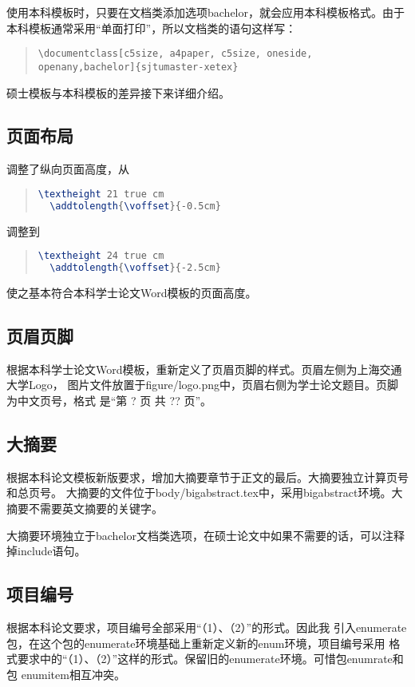 使用本科模板时，只要在文档类添加选项bachelor，就会应用本科模板格式。由于本科模板通常采用``单面打印''，所以文档类的语句这样写：

\begin{quote}
  {\scriptsize\verb+\documentclass[c5size, a4paper, c5size, oneside, openany,bachelor]{sjtumaster-xetex}+}
\end{quote}

硕士模板与本科模板的差异接下来详细介绍。

\subsection{页面布局}
\label{subsec:bachelor_pagelayout}
调整了纵向页面高度，从
\begin{quote}
  {
\begin{lstlisting}[language={TeX}]
  \textheight 21 true cm
  \addtolength{\voffset}{-0.5cm}
\end{lstlisting}
  }
\end{quote}
调整到
\begin{quote}
  {
\begin{lstlisting}[language={TeX}]
  \textheight 24 true cm
  \addtolength{\voffset}{-2.5cm}
\end{lstlisting}
  }
\end{quote}
使之基本符合本科学士论文Word模板的页面高度。

\subsection{页眉页脚}
\label{subsec:bachelor_fancyfnt}
根据本科学士论文Word模板，重新定义了页眉页脚的样式。页眉左侧为上海交通大学Logo，
图片文件放置于figure/logo.png中，页眉右侧为学士论文题目。页脚为中文页号，格式
是“第 ? 页 共 ?? 页”。

\subsection{大摘要}
\label{subsec:bigabstract}
根据本科论文模板新版要求，增加大摘要章节于正文的最后。大摘要独立计算页号和总页号。
大摘要的文件位于body/bigabstract.tex中，采用bigabstract环境。大摘要不需要英文摘要的关键字。

大摘要环境独立于bachelor文档类选项，在硕士论文中如果不需要的话，可以注释掉include语句。

\subsection{项目编号}
\label{subsec:bachelor_enumerate}
根据本科论文要求，项目编号全部采用``（1）、（2）''的形式。因此我
引入enumerate包，在这个包的enumerate环境基础上重新定义新的enum环境，项目编号采用
格式要求中的``（1）、（2）''这样的形式。保留旧的enumerate环境。可惜包enumrate和包
enumitem相互冲突。

